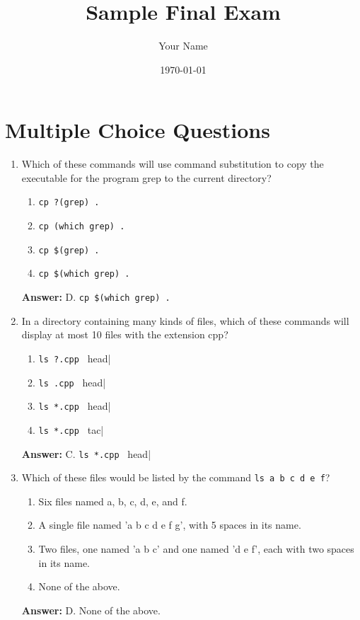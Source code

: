 \documentclass{article}
\begin{document}
\title{Sample Final Exam}
\author{Your Name}
\date{\today}
\maketitle

\section{Multiple Choice Questions}

\begin{enumerate}
    \item Which of these commands will use command substitution to copy the executable for the program grep to the current directory?
    \begin{enumerate}
        \item \verb|cp ?(grep) .|
        \item \verb|cp (which grep) .|
        \item \verb|cp $(grep) .|
        \item \verb|cp $(which grep) .|
    \end{enumerate}
    \textbf{Answer:} D. \verb|cp $(which grep) .|

    \item In a directory containing many kinds of files, which of these commands will display at most 10 files with the extension cpp?
    \begin{enumerate}
        \item \verb|ls ?.cpp | head|
        \item \verb|ls .cpp | head|
        \item \verb|ls *.cpp | head|
        \item \verb|ls *.cpp | tac|
    \end{enumerate}
    \textbf{Answer:} C. \verb|ls *.cpp | head|

    \item Which of these files would be listed by the command \verb|ls a b c d e f|?
    \begin{enumerate}
        \item Six files named a, b, c, d, e, and f.
        \item A single file named 'a b c d e f g', with 5 spaces in its name.
        \item Two files, one named 'a b c' and one named 'd e f', each with two spaces in its name.
        \item None of the above.
    \end{enumerate}
    \textbf{Answer:} D. None of the above.


\end{enumerate}
\end{document}
